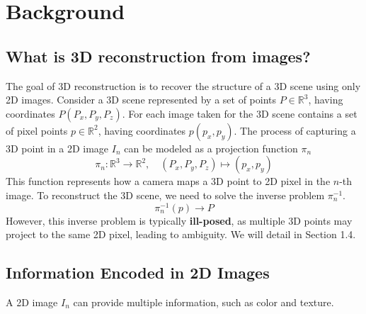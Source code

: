 \documentclass[12pt]{article}
\begin{document}
\section{Background}
\subsection{What is 3D reconstruction from images?}

The goal of 3D reconstruction is to recover the structure of a 3D scene using only 2D images.
Consider a 3D scene represented by a set of points $P \in \mathbb{R}^3$, having coordinates $P(P_x,P_y,P_z)$.
For each image taken for the 3D scene contains a set of pixel points $p \in \mathbb{R}^2$, having coordinates $p(p_x,p_y)$.
The process of capturing a 3D point in a 2D image $I_n$ can be modeled as a projection function $\pi_n$
\[
\pi_n: \mathbb{R}^3 \to \mathbb{R}^2, \quad (P_x, P_y, P_z) \mapsto (p_x, p_y)
\]
This function represents how a camera maps a 3D point to 2D pixel in the $n$-th image.
To reconstruct the 3D scene, we need to solve the inverse problem $\pi_n^{-1}$.
\[
\pi_n^{-1}(p) \to P
\]
However, this inverse problem is typically \textbf{ill-posed}, as multiple 3D points may project to the same 2D pixel, leading to ambiguity. We will detail in Section 1.4. 

\subsection{Information Encoded in 2D Images}
A 2D image $I_n$ can provide multiple information, such as color and texture. 
\end{document}
